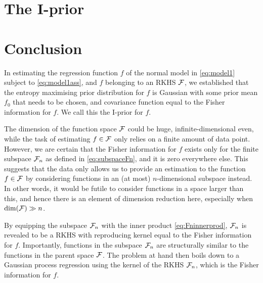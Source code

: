 \documentclass[a4paper,showframe,11pt]{report}
\begin{document}
\section{The I-prior}


\section{Conclusion}

In estimating the regression function $f$ of the normal model in \cref{eq:model1} subject to \cref{eq:model1ass}, and $f$ belonging to an RKHS ${\mathcal F}$, we established that the entropy maximising prior distribution for $f$ is Gaussian with some prior mean $f_0$ that needs to be chosen, and covariance function equal to the Fisher information for $f$.
We call this the I-prior for $f$.

The dimension of the function space ${\mathcal F}$ could be huge, infinite-dimensional even, while the task of estimating $f\in{\mathcal F}$ only relies on a finite amount of data point.
However, we are certain that the Fisher information for $f$ exists only for the finite subspace ${\mathcal F}_n$ as defined in \cref{eq:subspaceFn}, and it is zero everywhere else.
This suggests that the data only allows us to provide an estimation to the function $f\in{\mathcal F}$ by considering functions in an (at most) $n$-dimensional subspace instead.
In other words, it would be futile to consider functions in a space larger than this, and hence there is an element of dimension reduction here, especially when $\dim({\mathcal F}) \gg n$.

By equipping the subspace ${\mathcal F}_n$ with the inner product \cref{eq:Fninnerprod}, ${\mathcal F}_n$ is revealed to be a RKHS with reproducing kernel equal to the Fisher information for $f$.
Importantly, functions in the subspace ${\mathcal F}_n$ are structurally similar to the functions in the parent space ${\mathcal F}$.
The problem at hand then boils down to a Gaussian process regression using the kernel of the RKHS ${\mathcal F}_n$, which is the Fisher information for $f$.

%

\hClosingStuffStandalone
\end{document}
